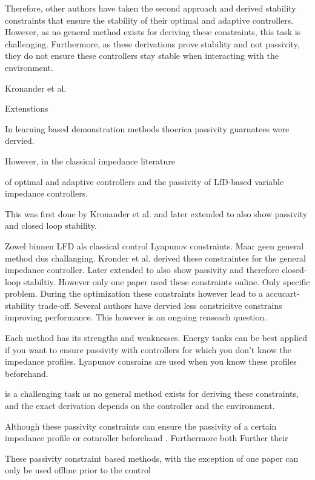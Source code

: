 Therefore, other authors have taken the second approach and derived stability constraints that ensure the stability of their optimal and adaptive controllers. However, as no general method exists for deriving these constraints, this task is challenging. Furthermore, as these derivations prove stability and not passivity, they do not ensure these controllers stay stable when interacting with the environment. 

Kronander et al.

Extenstions

In learning based demonstration methods thoerica passivity guarnatees were dervied.



However, in the classical  impedance literature 

of optimal and adaptive controllers and the passivity of LfD-based variable impedance controllers. 



This was first done by Kronander et al. and later extended to also show passivity and closed loop stability.




Zowel binnen LFD als classical control Lyapunov constraints.
Maar geen general method dus challanging.
Kronder et al. derived these constraintes for the general impedance controller.
Later extended to also show passivity and therefore closed-loop stabiltiy.
However only one paper used these constraints online. Only specific problem.
During the optimization these constraints however lead to a accucart-stability trade-off.
Several authors have dervied less constricitve constrains improving performance. 
This however is an ongoing reaseach question.

Each method has its strengths and weaknesses.
Energy tanks can be best applied if you want to ensure passivity with controllers for which you don't know the impedance profiles.
Lyapunov consrains are used when you know these profiles beforehand.

is a challenging task as no general method exists for deriving these constraints, and the exact derivation depends on the controller and the environment.


Although these passivity constraints can ensure the passivity of a certain impedance profile or cotnroller beforehand . Furthermore both 
Further their  

These passivity constraint based methods, with the exception of one paper can only be used offline prior to the control 





